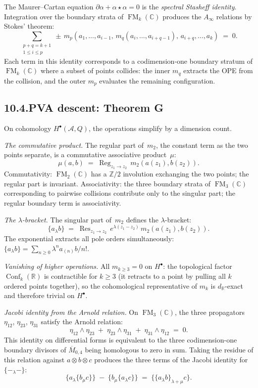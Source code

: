 \documentclass[11pt]{report}
\theoremstyle{definition}
\theoremstyle{remark}
\providecommand{\cA}{\mathcal{A}}
\numberwithin{equation}{section}
\begin{document}
The Maurer--Cartan equation
$\partial\alpha+\alpha\star\alpha=0$ is the \emph{spectral Stasheff
identity}. Integration over the boundary strata of
$\operatorname{FM}_k(\mathbb C)$ produces the $A_\infty$ relations
by Stokes' theorem:
\[
\sum_{\substack{p+q=k+1\\1\le i\le p}}
\pm\,m_p(a_1,\ldots,a_{i-1},\,m_q(a_i,\ldots,a_{i+q-1}),\,a_{i+q},\ldots,a_k)
\;=\;0.
\]
Each term in this identity corresponds to a codimension-one
boundary stratum of $\operatorname{FM}_k(\mathbb C)$ where a
subset of points collides: the inner $m_q$ extracts the OPE from
the collision, and the outer $m_p$ evaluates the remaining
configuration.

\subsection*{10.4.\enspace PVA descent: Theorem G}

On cohomology $H^\bullet(\cA,Q)$, the operations simplify by a
dimension count.

\medskip
\noindent\emph{The commutative product.}
The regular part of~$m_2$, the constant term as the two points
separate, is a commutative associative product~$\mu$:
\[
\mu(a,b)
\;=\;
\operatorname{Reg}_{z_1\to z_2}\,m_2(a(z_1),b(z_2)).
\]
Commutativity: $\operatorname{FM}_2(\mathbb C)$ has a $\mathbb Z/2$
involution exchanging the two points; the regular part is invariant.
Associativity: the three boundary strata of
$\operatorname{FM}_3(\mathbb C)$ corresponding to pairwise
collisions contribute only to the singular part; the regular
boundary term is associativity.

\medskip
\noindent\emph{The $\lambda$-bracket.}
The singular part of~$m_2$ defines the $\lambda$-bracket:
\[
\{a_\lambda b\}
\;=\;
\operatorname{Res}_{z_1\to z_2}\,
e^{\lambda(z_1-z_2)}\,
m_2(a(z_1),b(z_2)).
\]
The exponential extracts all pole orders simultaneously:
$\{a_\lambda b\}=\sum_{n\ge 0}\lambda^n a_{(n)}b/n!$.

\medskip
\noindent\emph{Vanishing of higher operations.}
All $m_{k\ge 3}=0$ on $H^\bullet$: the topological factor
$\operatorname{Conf}_k(\mathbb R)$ is contractible for $k\ge 3$
(it retracts to a point by pulling all $k$ ordered points together),
so the cohomological representative of $m_k$ is $d_{\mathbb R}$-exact
and therefore trivial on $H^\bullet$.

\medskip
\noindent\emph{Jacobi identity from the Arnold relation.}
On $\operatorname{FM}_3(\mathbb C)$, the three propagators
$\eta_{12}$, $\eta_{23}$, $\eta_{31}$ satisfy the Arnold relation:
\[
\eta_{12}\wedge\eta_{23}
\;+\;
\eta_{23}\wedge\eta_{31}
\;+\;
\eta_{31}\wedge\eta_{12}
\;=\;0.
\]
This identity on differential forms is equivalent to the three
codimension-one boundary divisors of $\overline M_{0,4}$ being
homologous to zero in sum. Taking the residue of this relation
against $a\otimes b\otimes c$ produces the three terms of the
Jacobi identity for $\{-_\lambda-\}$:
\[
\{a_\lambda\{b_\mu c\}\}
\;-\;
\{b_\mu\{a_\lambda c\}\}
\;=\;
\{\{a_\lambda b\}_{\lambda+\mu}c\}.
\]
\end{document}
